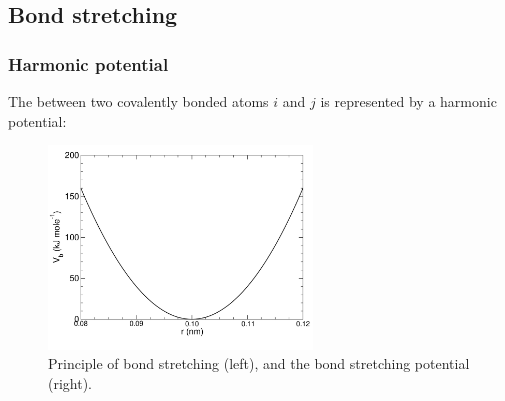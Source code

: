 \subsection{Bond stretching}
\label{sec:bondpot}
\subsubsection{Harmonic potential}
\label{subsec:harmonicbond}
The  between two covalently bonded atoms
$i$ and $j$ is represented by a harmonic potential:

\begin{figure}
\centerline{\includegraphics[width=7cm]{plots/f-bond}}
\caption[Bond stretching.]{Principle of bond stretching (left), and the bond
stretching potential (right).}
\label{fig:bstretch1}
\end{figure}


